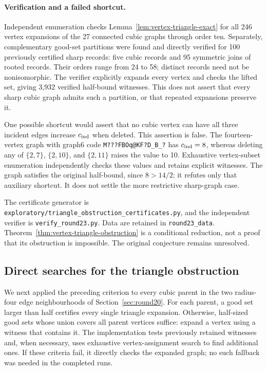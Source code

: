 \documentclass[11pt]{article}
\begin{document}
\paragraph{Verification and a failed shortcut.}
Independent enumeration checks Lemma~\ref{lem:vertex-triangle-exact}
for all 246 vertex expansions of the 27 connected cubic graphs
through order ten. Separately, complementary good-set partitions
were found and directly verified for 100 previously certified sharp
records: five cubic records and 95 symmetric joins of rooted records.
Their orders range from 24 to 58; distinct records need not be
nonisomorphic. The verifier explicitly expands every vertex and
checks the lifted set, giving 3,932 verified half-bound witnesses.
This does not assert that every sharp cubic graph admits such a
partition, or that repeated expansions preserve it.

One possible shortcut would assert that no cubic vertex can have
all three incident edges increase $c_{\rm ind}$ when deleted. This
assertion is false. The fourteen-vertex graph with graph6 code
\texttt{M???FBOq@KF?D\_B\_?} has $c_{\rm ind}=8$, whereas deleting
any of $\{2,7\}$, $\{2,10\}$, and $\{2,11\}$ raises the value to
10. Exhaustive vertex-subset enumeration independently checks these
values and retains explicit witnesses. The graph satisfies the
original half-bound, since $8>14/2$; it refutes only that auxiliary
shortcut. It does not settle the more restrictive sharp-graph case.

The certificate generator is
\texttt{exploratory/triangle\_obstruction\_certificates.py}, and the
independent verifier is \texttt{verify\_round23.py}. Data are retained
in \texttt{round23\_data}. Theorem~\ref{thm:vertex-triangle-obstruction}
is a conditional reduction, not a proof that its obstruction is
impossible. The original conjecture remains unresolved.

\subsection{Direct searches for the triangle obstruction}
\label{sec:round24}
We next applied the preceding criterion to every cubic parent in
the two radius-four edge neighbourhoods of Section~\ref{sec:round20}.
For each parent, a good set larger than half certifies every single
triangle expansion. Otherwise, half-sized good sets whose union
covers all parent vertices suffice: expand a vertex using a witness
that contains it. The implementation tests previously retained
witnesses and, when necessary, uses exhaustive vertex-assignment
search to find additional ones. If these criteria fail, it directly
checks the expanded graph; no such fallback was needed in the
completed runs.
\end{document}
